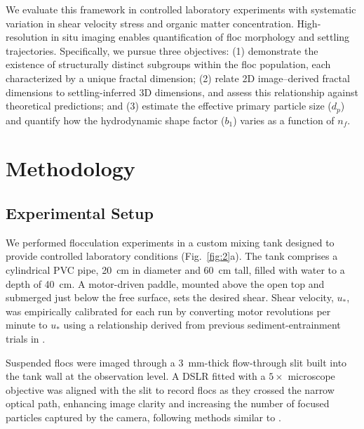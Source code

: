 \documentclass{agujournal2019}
\begin{document}
We evaluate this framework in controlled laboratory experiments with systematic variation in shear velocity stress and organic matter concentration. High-resolution in situ imaging enables quantification of floc morphology and settling trajectories. Specifically, we pursue three objectives: (1) demonstrate the existence of structurally distinct subgroups within the floc population, each characterized by a unique fractal dimension; (2) relate 2D image–derived fractal dimensions to settling-inferred 3D dimensions, and assess this relationship against theoretical predictions; and (3) estimate the effective primary particle size ($d_p$) and quantify how the hydrodynamic shape factor ($b_1$) varies as a function of $n_f$. 

\section{Methodology}

\subsection{Experimental Setup}

We performed flocculation experiments in a custom mixing tank designed to provide controlled laboratory conditions (Fig.~\ref{fig:2}a). The tank comprises a cylindrical PVC pipe, 20~cm in diameter and 60~cm tall, filled with water to a depth of 40~cm. A motor-driven paddle, mounted above the open top and submerged just below the free surface, sets the desired shear. Shear velocity, $u_\ast$, was empirically calibrated for each run by converting motor revolutions per minute to $u_\ast$ using a relationship derived from previous sediment-entrainment trials in .

Suspended flocs were imaged through a 3~mm-thick flow-through slit built into the tank wall at the observation level. A DSLR fitted with a $5\times$ microscope objective was aligned with the slit to record flocs as they crossed the narrow optical path, enhancing image clarity and increasing the number of focused particles captured by the camera, following methods similar to .
\end{document}
